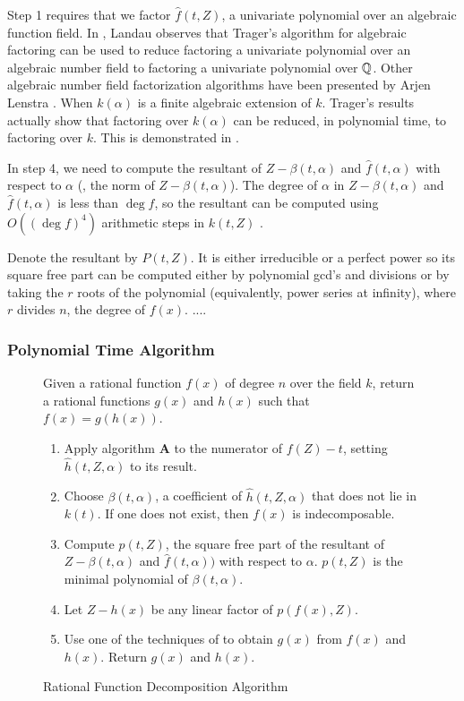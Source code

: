 Step 1 requires that we factor $\hat{f}(t, Z)$, a univariate
polynomial over an algebraic function field.  In \cite{Landau1985-ov},
Landau observes that Trager's algorithm for algebraic factoring
\cite{Trager1976-wn} can be used to reduce factoring a univariate
polynomial over an algebraic number field to factoring a univariate
polynomial over $\mathbb{Q}$.  Other algebraic number field factorization
algorithms have been presented by Arjen Lenstra
\cite{Lenstra1983-yz,Lenstra1987-if}.  When $k(\alpha)$ is a finite
algebraic extension of $k$.  Trager's results actually show that
factoring over $k(\alpha)$ can be reduced, in polynomial time, to
factoring over $k$.  This is demonstrated in
.

In step 4, we need to compute the resultant of $Z - \beta(t, \alpha)$
and $\hat{f}(t, \alpha)$ with respect to $\alpha$ (\ie, the norm of $Z
-\beta(t, \alpha)$).  The degree of $\alpha$ in $Z - \beta(t, \alpha)$
and $\hat{f}(t, \alpha)$ is less than $\deg f$, so the resultant can
be computed using $O((\deg f)^4)$ arithmetic steps in $k(t, Z)$
\cite{Brown1978-ef}. 

Denote the resultant by $P(t, Z)$.  It is either irreducible or a
perfect power so its square free part can be computed either by
polynomial gcd's and divisions or by taking the $r$\th{} roots of the
polynomial (equivalently, power series at infinity), where $r$ divides
$n$, the degree of $f(x)$. ....


\subsubsection{Polynomial Time Algorithm}
\label{Poly:Time:Sec}

\begin{figure}
\small
{} Given a rational function $f(x)$ of degree $n$
over the field $k$, return a rational functions $g(x)$ and $h(x)$ such that
$f(x) = g(h(x))$. 
\begin{enumerate}
\item Apply algorithm {\bf A} to the numerator of $f(Z) - t$, setting 
$\hat{h}(t, Z, \alpha)$ to its result.
\item Choose $\beta(t, \alpha)$, a coefficient of $\hat{h}(t, Z, \alpha)$ that
does not lie in $k(t)$.  If one does not exist, then $f(x)$ is
indecomposable.
\item Compute $p(t, Z)$, the square free part of the resultant of $Z -
\beta(t, \alpha)$ and $\hat{f}(t, \alpha))$ with respect to $\alpha$.
$p(t, Z)$ is the minimal polynomial of $\beta(t, \alpha)$.
\item Let $Z - h(x)$ be any linear factor of $p(f(x), Z)$.
\item Use one of the techniques of  to obtain
$g(x)$ from $f(x)$ and $h(x)$.  Return $g(x)$ and $h(x)$. 
\end{enumerate}
\caption{Rational Function Decomposition Algorithm\label{Alg:D:Fig}}
\end{figure}

